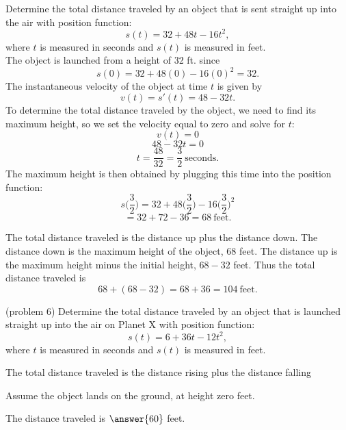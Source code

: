 \documentclass[handout]{ximera}
\begin{document}
\begin{foldable}
\end{foldable}

 
\begin{example}[example 6]
Determine the total distance traveled by
an object that is sent straight up into the air with position function:
\[s(t) = 32 + 48t - 16t^2,\]
where $t$ is measured in seconds and $s(t)$ is measured in feet. \\
The object is launched from a height of 32 ft. since 
\[s(0) = 32 + 48(0) - 16(0)^2 = 32.\]
The instantaneous velocity of the object at time $t$ is given by
\[v(t) = s'(t) = 48-32t.\]
To determine the total distance traveled by the object, we need to find its maximum height, so
we set the velocity equal to zero and solve for $t$:
\[v(t) = 0  \] 
\[48-32t = 0\]
\[t = \frac{48}{32} = \frac{3}{2} \ \text{seconds}.\]
The maximum height is then obtained by plugging this time into the position function:
\[s\Big(\frac{3}{2}\Big) = 32 + 48\Big(\frac{3}{2}\Big) - 16\Big(\frac{3}{2}\Big)^2 \]
\[= 32 + 72 - 36 = 68 \  \text{feet}. \]

The total distance traveled is the distance up plus the distance down.  The distance down is the maximum height of the object,
$68$ feet.  The distance up is the maximum height minus the initial height, $68 - 32$ feet.
Thus the total distance traveled is  
\[68 + (68 - 32) = 68 + 36 = 104 \ \text{feet}.\]
\end{example}



\begin{problem}(problem 6)
Determine the total distance traveled by an object that is launched straight up into the air on Planet X with position function:
\[s(t) = 6 + 36t - 12t^2,\]
where $t$ is measured in seconds and $s(t)$ is measured in feet. 

\begin{hint}
The total distance traveled is the distance rising plus the distance falling
\end{hint}
\begin{hint}
Assume the object lands on the ground, at height zero feet.
\end{hint}

The distance traveled is $\answer{60}$ feet.

\end{problem}
\end{document}
